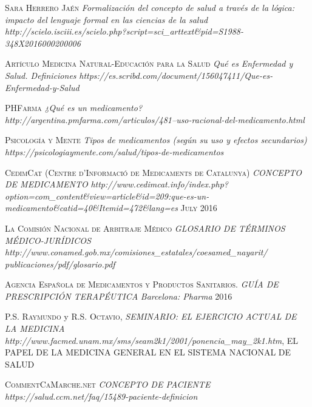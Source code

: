 
\begin{thebibliography}{X}
	
	 \textsc{Sara Herrero Jaén} \textit{Formalización del concepto de salud a través de la lógica: impacto del lenguaje formal en las ciencias de la salud} \textit{http://scielo.isciii.es/scielo.php?script=sci\_arttext\&pid=S1988-348X2016000200006} 
	
	 \textsc{Artículo Medicina Natural-Educación para la Salud} \textit{Qué es Enfermedad y Salud. Definiciones} \textit{https://es.scribd.com/document/156047411/Que-es-Enfermedad-y-Salud} 
	
	 \textsc{PHFarma} \textit{¿Qué es un medicamento?} \textit{http://argentina.pmfarma.com/articulos/481--uso-racional-del-medicamento.html} 
	
	 \textsc{Psicología y Mente} \textit{Tipos de medicamentos (según su uso y efectos secundarios)} \textit{https://psicologiaymente.com/salud/tipos-de-medicamentos}
	
	 \textsc{CedimCat (Centre d'Informació de Medicaments de Catalunya)} \textit{CONCEPTO DE MEDICAMENTO} \textit{http://www.cedimcat.info/index.php?option=com\_content\&view=article\&id=209:que-es-un-medicamento\&catid=40\&Itemid=472\&lang=es} \textsc{July 2016}
	
	 \textsc{La Comisión Nacional de Arbitraje Médico} \textit{GLOSARIO DE TÉRMINOS MÉDICO-JURÍDICOS} \textit{http://www.conamed.gob.mx/comisiones\_estatales/coesamed\_nayarit/
publicaciones/pdf/glosario.pdf}
	
	 \textsc{Agencia Española de Medicamentos y Productos Sanitarios.} \textit{GUÍA DE PRESCRIPCIÓN TERAPÉUTICA} \textit{Barcelona: Pharma} \textsc{2016}
	
	 \textsc{P.S. Raymundo} y \textsc{R.S. Octavio}, \textit{SEMINARIO: EL EJERCICIO ACTUAL DE LA MEDICINA}
	\textit{http://www.facmed.unam.mx/sms/seam2k1/2001/ponencia\_may\_2k1.htm}, EL PAPEL DE LA MEDICINA GENERAL EN EL SISTEMA NACIONAL DE SALUD
	
	 \textsc{CommentCaMarche.net} \textit{CONCEPTO DE PACIENTE} \textit{https://salud.ccm.net/faq/15489-paciente-definicion}
	

\end{thebibliography}
